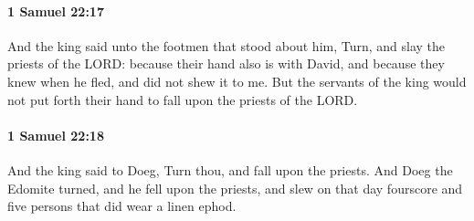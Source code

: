 		\paragraph{1 Samuel 22:17} %
			\label{1SAMUEL-22-17}

			And the king said unto the footmen that stood about him, Turn, and slay the priests of the LORD: because their hand also is with David, and because they knew when he fled, and did not shew it to me. But the servants of the king would not put forth their hand to fall upon the priests of the LORD.


		\paragraph{1 Samuel 22:18} %
			\label{1SAMUEL-22-18}

			And the king said to Doeg, Turn thou, and fall upon the priests. And Doeg the Edomite turned, and he fell upon the priests, and slew on that day fourscore and five persons that did wear a linen ephod.

